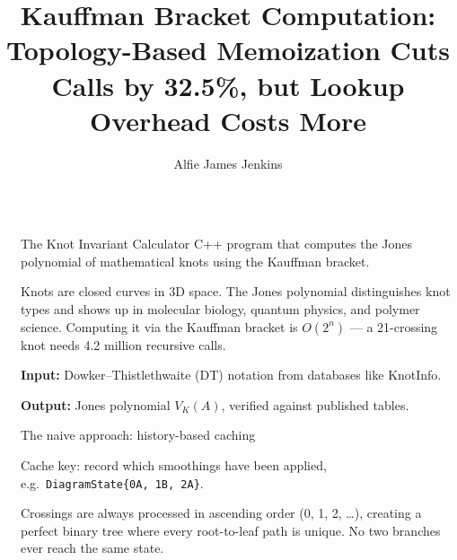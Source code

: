 \documentclass[final]{beamer}
\title{Kauffman Bracket Computation: Topology-Based Memoization Cuts Calls by 32.5\%, but Lookup Overhead Costs More}
\author{Alfie James Jenkins}
\institute[shortinst]{Falmouth University -- COMP203 Optimization}
\newlength{\sepwidth}
\newlength{\colwidth}
\newcommand{\separatorcolumn}{\begin{column}{\sepwidth}\end{column}}
\begin{document}
\begin{frame}[t,fragile]
\begin{columns}[t]
\separatorcolumn

\begin{column}{\colwidth}

  \begin{block}{The Knot Invariant Calculator}
    C++ program that computes the Jones polynomial of mathematical knots using the Kauffman bracket.
    
    \vspace{0.15cm}
    Knots are closed curves in 3D space. The Jones polynomial distinguishes knot types and shows up in molecular biology, quantum physics, and polymer science. Computing it via the Kauffman bracket is $O(2^n)$ --- a 21-crossing knot needs 4.2 million recursive calls.

    \vspace{0.15cm}
    \textbf{Input:} Dowker--Thistlethwaite (DT) notation from databases like KnotInfo.
    
    \textbf{Output:} Jones polynomial $V_K(A)$, verified against published tables.
  \end{block}

  \begin{alertblock}{The naive approach: history-based caching}
    
    Cache key: record which smoothings have been applied, e.g.\ \texttt{DiagramState\{0{\to}A,\ 1{\to}B,\ 2{\to}A\}}.

    \vspace{0.1cm}
    Crossings are always processed in ascending order (0, 1, 2, \ldots), creating a perfect binary tree where every root-to-leaf path is unique. No two branches ever reach the same state.


\end{alertblock}
\end{column}
\end{columns}
\end{frame}
\end{document}
